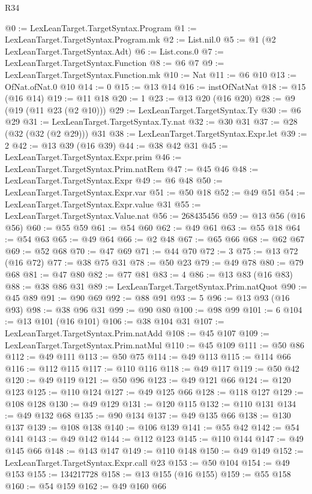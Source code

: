 \begin{lexlean}{R34}
\begin{coremodule}
@0 := LexLeanTarget.TargetSyntax.Program
@1 := LexLeanTarget.TargetSyntax.Program.mk
@2 := List.nil.{0}
@5 := @1 (@2 LexLeanTarget.TargetSyntax.Adt)
@6 := List.cons.{0}
@7 := LexLeanTarget.TargetSyntax.Function
@8 := @6 @7
@9 := LexLeanTarget.TargetSyntax.Function.mk
@10 := Nat
@11 := @6 @10
@13 := OfNat.ofNat.{0} @10
@14 := 0
@15 := @13 @14
@16 := instOfNatNat
@18 := @15 (@16 @14)
@19 := @11 @18
@20 := 1
@23 := @13 @20 (@16 @20)
@28 := @9 (@19 (@11 @23 (@2 @10)))
@29 := LexLeanTarget.TargetSyntax.Ty
@30 := @6 @29
@31 := LexLeanTarget.TargetSyntax.Ty.nat
@32 := @30 @31
@37 := @28 (@32 (@32 (@2 @29))) @31
@38 := LexLeanTarget.TargetSyntax.Expr.let
@39 := 2
@42 := @13 @39 (@16 @39)
@44 := @38 @42 @31
@45 := LexLeanTarget.TargetSyntax.Expr.prim
@46 := LexLeanTarget.TargetSyntax.Prim.natRem
@47 := @45 @46
@48 := LexLeanTarget.TargetSyntax.Expr
@49 := @6 @48
@50 := LexLeanTarget.TargetSyntax.Expr.var
@51 := @50 @18
@52 := @49 @51
@54 := LexLeanTarget.TargetSyntax.Expr.value @31
@55 := LexLeanTarget.TargetSyntax.Value.nat
@56 := 268435456
@59 := @13 @56 (@16 @56)
@60 := @55 @59
@61 := @54 @60
@62 := @49 @61
@63 := @55 @18
@64 := @54 @63
@65 := @49 @64
@66 := @2 @48
@67 := @65 @66
@68 := @62 @67
@69 := @52 @68
@70 := @47 @69
@71 := @44 @70
@72 := 3
@75 := @13 @72 (@16 @72)
@77 := @38 @75 @31
@78 := @50 @23
@79 := @49 @78
@80 := @79 @68
@81 := @47 @80
@82 := @77 @81
@83 := 4
@86 := @13 @83 (@16 @83)
@88 := @38 @86 @31
@89 := LexLeanTarget.TargetSyntax.Prim.natQuot
@90 := @45 @89
@91 := @90 @69
@92 := @88 @91
@93 := 5
@96 := @13 @93 (@16 @93)
@98 := @38 @96 @31
@99 := @90 @80
@100 := @98 @99
@101 := 6
@104 := @13 @101 (@16 @101)
@106 := @38 @104 @31
@107 := LexLeanTarget.TargetSyntax.Prim.natAdd
@108 := @45 @107
@109 := LexLeanTarget.TargetSyntax.Prim.natMul
@110 := @45 @109
@111 := @50 @86
@112 := @49 @111
@113 := @50 @75
@114 := @49 @113
@115 := @114 @66
@116 := @112 @115
@117 := @110 @116
@118 := @49 @117
@119 := @50 @42
@120 := @49 @119
@121 := @50 @96
@123 := @49 @121 @66
@124 := @120 @123
@125 := @110 @124
@127 := @49 @125 @66
@128 := @118 @127
@129 := @108 @128
@130 := @49 @129
@131 := @120 @115
@132 := @110 @131
@134 := @49 @132 @68
@135 := @90 @134
@137 := @49 @135 @66
@138 := @130 @137
@139 := @108 @138
@140 := @106 @139
@141 := @55 @42
@142 := @54 @141
@143 := @49 @142
@144 := @112 @123
@145 := @110 @144
@147 := @49 @145 @66
@148 := @143 @147
@149 := @110 @148
@150 := @49 @149
@152 := LexLeanTarget.TargetSyntax.Expr.call @23
@153 := @50 @104
@154 := @49 @153
@155 := 134217728
@158 := @13 @155 (@16 @155)
@159 := @55 @158
@160 := @54 @159
@162 := @49 @160 @66

\end{coremodule}
\end{lexlean}
